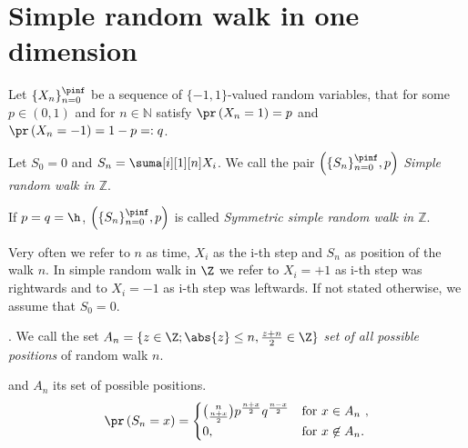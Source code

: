 \chapter{Simple random walk in one dimension}


\begin{defn}\label{defn-simple_random_walk_Z}
 Let $\{X_n\}_{n=0}^\pinf$ be a sequence of  \iid $\{-1,1\}$-valued random variables, that for some $p\in(0,1)$ and for $n\in \mathbb{N}$ satisfy $\pr \left( X_n=1 \right) =p$ and $\pr \left( X_n=-1 \right) =1-p=:q$.

 Let $S_0=0$ and $S_n=\suma[i][1][n]X_i$. We call the pair $ \left( \{S_n\}_{n=0}^\pinf, p \right) $ \emph{Simple random walk in $\mathbb{Z}$}.

 If $p=q=\h $, $ \left( \{S_n\}_{n=0}^\pinf, p \right) $ is called
 \emph{Symmetric simple random walk in $\mathbb{Z}$}.
\end{defn}
\begin{rem}
 Very often we refer to $n$ as time, $X_i$ as the i-th step and $S_n$ as position of the walk \intime $n$.
 In simple random walk in $\Z$ we refer to $X_i=+1$ as i-th step was rightwards and to $X_i=-1$ as i-th step was leftwards. If not stated otherwise, we assume that $S_0=0.$
\end{rem}

\begin{defn}\label{defn-set_all_possible_values}
 \Lrw. We call the set $A_n=\{z \in \Z; \abs{z}\leq n, \frac{z+n}{2}\in \Z \}$ \emph{set of all possible positions} of random walk \rw \intime $n$.
\end{defn}


\begin{thm}\label{thm-probability_position_time}
 \Lrw and $A_n$ its set of possible positions.
 \[
 \pr \left( S_n=x \right) =
 \begin{cases}
 \binom{n}{\frac{n+x}{2}}p^{\frac{n+x}{2}}q^{\frac{n-x}{2}} & \text{for $x \in A_n$ },\\
 0, & \text{for $x \not\in A_n$}.
 \end{cases}
 \]

\end{thm}

